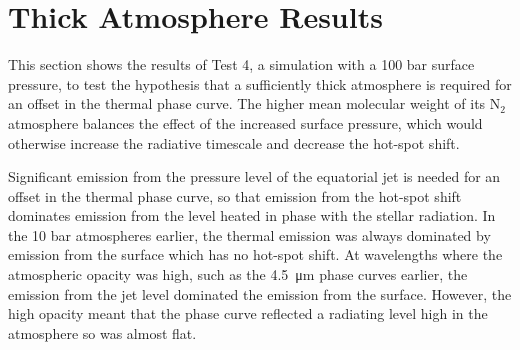 
%
%
%
%


\section{Thick Atmosphere Results}\label{sec:100-bar-simulation}

This section shows the results of Test 4, a simulation with a 100 bar surface pressure, to test the hypothesis that a sufficiently thick atmosphere is required for an offset in the thermal phase curve. The higher mean molecular weight of its N$_{2}$ atmosphere balances the effect of the increased surface pressure, which would otherwise increase the radiative timescale and decrease the hot-spot shift.

Significant emission from the pressure level of the equatorial jet is needed for an offset in the thermal phase curve, so that emission from the hot-spot shift dominates emission from the level heated in phase with the stellar radiation. In the 10 bar atmospheres earlier, the thermal emission was always dominated by emission from the surface which has no hot-spot shift. At wavelengths where the atmospheric opacity was high, such as the \SI{4.5}{\micro\metre} phase curves earlier, the emission from the jet level dominated the emission from the surface. However, the high opacity meant that the phase curve reflected a radiating level high in the atmosphere so was almost flat.

